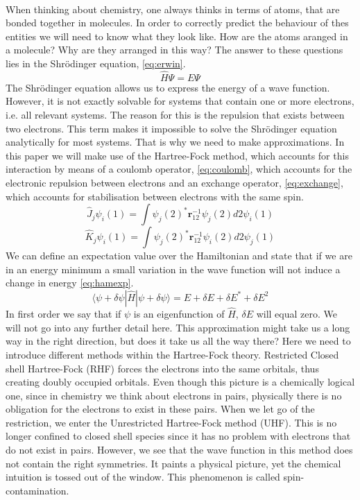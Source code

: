 \documentclass[twoside,twocolumn,9pt]{article}
\begin{document}
\paragraph*{}
When thinking about chemistry, one always thinks in terms of atoms, that are bonded together in molecules. In order to correctly predict the behaviour of
thes entities we will need to know what they look like. How are the atoms aranged in a molecule? Why are they arranged in this way? The answer to these
questions lies in the Shrödinger equation, \eqref{eq:erwin}.
\begin{equation}\label{eq:erwin}
  \hat{H}\Psi = E\Psi
\end{equation}
The Shrödinger equation allows us to express the energy of a wave function. However, it is not exactly solvable for systems that contain one or more electrons,
i.e. all relevant systems. The reason for this is the repulsion that exists between two electrons. This term makes it impossible to solve the Shrödinger equation
analytically for most systems. That is why we need to make approximations. In this paper we will make use of the Hartree-Fock method, which accounts for this
interaction by means of a coulomb operator, \eqref{eq:coulomb}, which accounts for the electronic repulsion between electrons and an exchange operator,
\eqref{eq:exchange}, which accounts for stabilisation between electrons with the same spin.
\begin{equation}\label{eq:coulomb}
  \hat{J}_j\psi_i(1) = \int\psi_j(2)^*\boldsymbol{r}_{12}^{-1}\psi_j(2)d2 \psi_i(1)
\end{equation}
\begin{equation}\label{eq:exchange}
  \hat{K}_j\psi_i(1) = \int\psi_j(2)^*\boldsymbol{r}_{12}^{-1}\psi_i(2)d2 \psi_j(1)
\end{equation}
We can define an expectation value over the Hamiltonian and state that if we are in an energy minimum a small variation in the wave function will not induce a change
in energy \eqref{eq:hamexp}.
\begin{equation}\label{eq:hamexp}
  \langle\psi + \delta\psi|\hat{H}|\psi + \delta\psi \rangle = E + \delta E + \delta E^* + \delta E^2
\end{equation}
In first order we say that if $\psi$ is an eigenfunction of $\hat{H}$, $\delta E$ will equal zero. We will not go into any further detail here.
This approximation might take us a long way in the right direction, but does it take us all the way there? Here we need to introduce different methods within the
Hartree-Fock theory. Restricted Closed shell Hartree-Fock (RHF) forces the electrons into the same orbitals, thus creating doubly occupied orbitals. Even though this
picture is a chemically logical one, since in chemistry we think about electrons in pairs, physically there is no obligation for the electrons to exist in these pairs.
When we let go of the restriction, we enter the Unrestricted Hartree-Fock method (UHF). This  is no longer confined to closed shell species since it has no problem with
electrons that do not exist in pairs. However, we see that the wave function in this method does not contain the right symmetries. It paints a physical picture, yet the
chemical intuition is tossed out of the window. This phenomenon is called spin-contamination.
\end{document}
